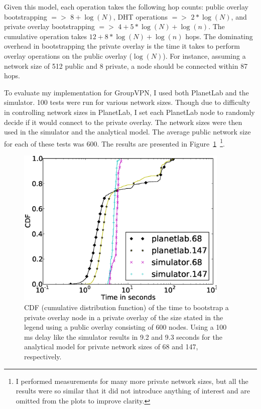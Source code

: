 Given this model, each operation takes the following hop counts: public overlay
bootstrapping $=>$ $8 + \log(N)$, DHT operations $=>$ $2 * \log(N)$, and
private overlay bootstrapping $=>$ $4 + 5 * \log(N) + \log(n)$.  The cumulative
operation takes $12 + 8 * \log(N) + \log(n)$ hops.  The dominating overhead in
bootstrapping the private overlay is the time it takes to perform overlay
operations on the public overlay ($\log(N)$).  For instance, assuming a network
size of 512 public and 8 private, a node should be connected within 87 hops.

To evaluate my implementation for GroupVPN, I used both PlanetLab and the
simulator.  100 tests were run for various network sizes.  Though due to
difficulty in controlling network sizes in PlanetLab, I set each PlanetLab node
to randomly decide if it would connect to the private overlay.  The network
sizes were then used in the simulator and the analytical model.  The average
public network size for each of these tests was 600.  The results are presented
in Figure~\ref{fig:private_bootstrapping}~\footnote{I performed measurements
for many more private network sizes, but all the results were so similar that
it did not introduce anything of interest and are omitted from the  plots to
improve clarity.}.

\begin{figure}[ht]
\centering
\includegraphics[width=4in]{figs/private.eps}
\caption[CDF of private overlay bootstrap time]{CDF (cumulative distribution
function) of the time to bootstrap a private overlay node in a private overlay
of the size stated in the legend using a public overlay consisting of 600
nodes.  Using a 100 ms delay like the simulator results in 9.2 and 9.3 seconds
for the analytical model for private network sizes of 68 and 147,
respectively.}
\label{fig:private_bootstrapping}
\end{figure}

